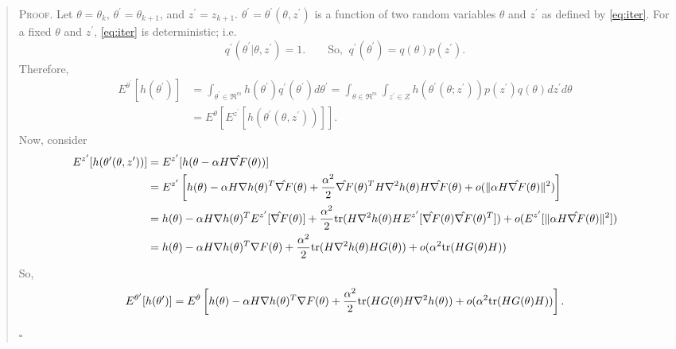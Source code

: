 \documentclass[12pt]{article}
\begin{document}
\begin{quote}
\textsc{Proof.} Let $\theta=\theta_k$, $\theta^\prime=\theta_{k+1}$, and $z^\prime=z_{k+1}$.  $\theta^\prime = \theta^\prime(\theta,z^\prime)$ is a function of two random variables $\theta$ and $z^\prime$ as defined by \eqref{eq:iter}.  For a fixed $\theta$ and $z^\prime$, \eqref{eq:iter} is deterministic; i.e.
\[
q^\prime(\theta^\prime|\theta,z^\prime)=1. \qquad \mbox{So, } \ q^\prime(\theta^\prime) = q(\theta)p(z^\prime).
\]
Therefore,
\begin{align*}
 E^{\theta^\prime}[h(\theta^\prime)] &= \int_{\theta^\prime\in\Re^m} h(\theta^\prime)q^\prime(\theta^\prime)d\theta^\prime 
 = \int_{\theta\in\Re^m}\int_{z^\prime\in Z} h(\theta^\prime(\theta;z^\prime))p(z^\prime)q(\theta)dz^\prime d\theta\\
 &= E^{\theta}[E^{z^\prime}[h(\theta^\prime(\theta,z^\prime))]].
\end{align*}
Now, consider
\begin{align*}
 E^{z^\prime}[h(\theta^\prime(\theta,z^\prime))] &= E^{z^\prime}[h(\theta-\alpha H \hat{\nabla F}(\theta))]\\	
 &=E^{z^\prime}\left[ h(\theta)-\alpha H \nabla h(\theta)^T\hat{\nabla F}(\theta)+\frac{\alpha^2}{2}\hat{\nabla F}(\theta)^TH\nabla^2h(\theta)H\hat{\nabla F}(\theta) + o(\|\alpha H \hat{\nabla F}(\theta)\|^2)\right]\\
 &= h(\theta)-\alpha H \nabla h(\theta)^TE^{z^\prime}[\hat{\nabla F}(\theta)]+\frac{\alpha^2}{2}\mbox{tr}(H\nabla^2h(\theta)HE^{z^\prime}[\hat{\nabla F}(\theta)\hat{\nabla F}(\theta)^T]) + o(E^{z^\prime}[\|\alpha H \hat{\nabla F}(\theta)\|^2])\\
 &=h(\theta)-\alpha H \nabla h(\theta)^T\nabla F(\theta)+\frac{\alpha^2}{2}\mbox{tr}(H\nabla^2h(\theta)HG(\theta))+o(\alpha^2\mbox{tr}(HG(\theta)H))
\end{align*}
So,
\[
 E^{\theta^\prime}[h(\theta^\prime)] = E^{\theta}\left[h(\theta)-\alpha H \nabla h(\theta)^T\nabla F(\theta)+\frac{\alpha^2}{2}\mbox{tr}(HG(\theta)H\nabla^2h(\theta))+o(\alpha^2\mbox{tr}(HG(\theta)H))\right].
\]
\begin{flushright}$\square$\end{flushright}
\end{quote}
\normalsize

\bigskip
\end{document}
